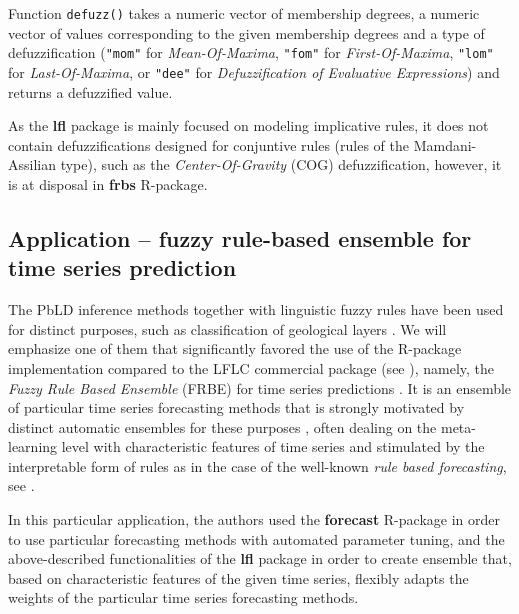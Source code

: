 \documentclass[review]{elsarticle}
\newcommand{\pkg}[1]{\textbf{#1}}
\newcommand{\proglang}[1]{#1}
\newcommand{\code}[1]{\texttt{#1}}
\begin{document}
Function \code{defuzz()} takes a numeric vector of membership degrees, a numeric vector of values corresponding to the given membership degrees and a type of defuzzification (\code{"mom"} for \emph{Mean-Of-Maxima}, \code{"fom"} for \emph{First-Of-Maxima}, \code{"lom"} for \emph{Last-Of-Maxima}, or \code{"dee"} for \emph{Defuzzification of Evaluative Expressions}) and returns a defuzzified value.



As the \pkg{lfl} package is mainly focused on modeling implicative rules, it does not contain defuzzifications designed for conjuntive rules (rules of the Mamdani-Assilian type), such as the
\emph{Center-Of-Gravity} (COG) defuzzification, however, it is at disposal in \pkg{frbs} \proglang{R}-package.




\subsection{Application -- fuzzy rule-based ensemble for time series prediction}

The PbLD inference methods together with linguistic fuzzy rules have been used for distinct purposes, such as classification of geological layers \citep{Novak_Geology_Chapter}. We will emphasize one of them that significantly favored the use of the \proglang{R}-package implementation compared to the LFLC commercial package (see \cite{dvo:lflc}), namely, the \emph{Fuzzy Rule Based Ensemble} (FRBE) for time series predictions \citep{frbe2014}. It is an ensemble of particular time series forecasting methods that is strongly motivated by distinct automatic ensembles for these purposes \citep{Devon_Sven_ensemble2010}, often dealing on the meta-learning level with characteristic features of time series \citep{Gabrys_Lemke_IEEE} and stimulated by the interpretable form of rules as in the case of the well-known \emph{rule based forecasting}, see \cite{armstrong:RBFeval_book}.

In this particular application, the  authors used the \pkg{forecast} \proglang{R}-package \citep{R:forecast} in order to use particular forecasting methods with automated parameter tuning, and the above-described functionalities of the \pkg{lfl} package in order to create ensemble that, based on characteristic features of the given time series, flexibly adapts the weights of the particular time series forecasting methods. 
\end{document}
